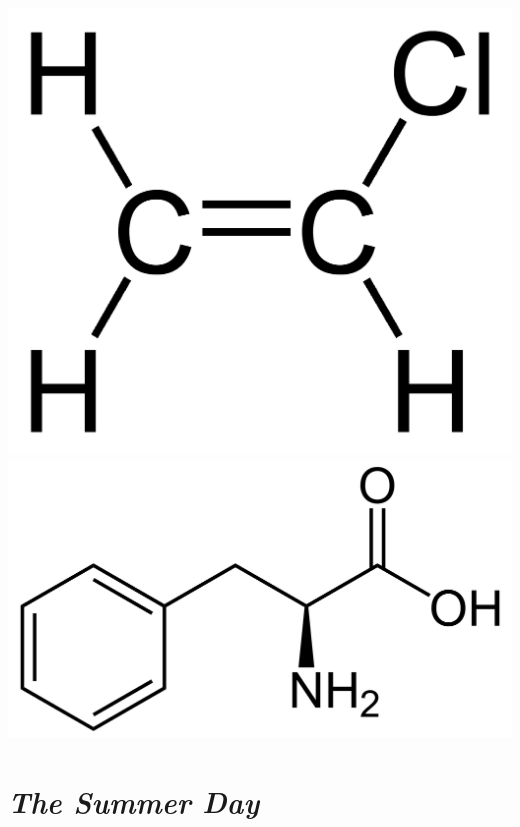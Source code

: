 \documentclass[11pt, letterpaper]{memoir}
\begin{document}
{  \includegraphics[scale=0.07]{vinyl_chloride.png} \hspace{15em} \includegraphics[scale=0.07]{phenylalinine.png}
	\newpage
	\pagestyle{empty}
	\addtocounter{page}{-1}
  \section*{\emph{The Summer Day}}
}
\end{document}
